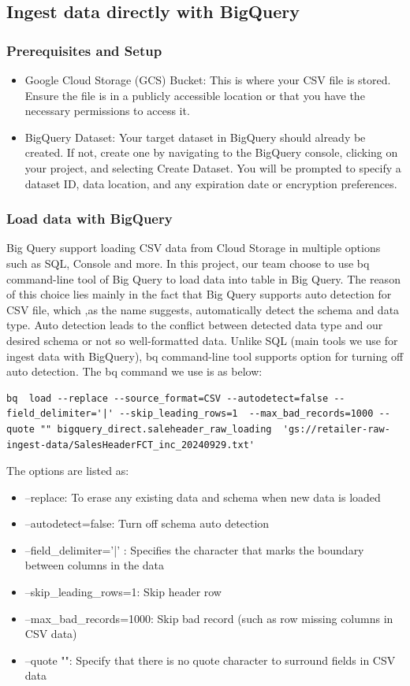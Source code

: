 \subsection{Ingest data directly with BigQuery}
\subsubsection{Prerequisites and Setup}
\begin{itemize}
    \item Google Cloud Storage (GCS) Bucket: This is where your CSV file is stored. Ensure the file is in a publicly accessible location or that you have the necessary permissions to access it.
\item BigQuery Dataset: Your target dataset in BigQuery should already be created. If not, create one by navigating to the BigQuery console, clicking on your project, and selecting Create Dataset. You will be prompted to specify a dataset ID, data location, and any expiration date or encryption preferences.
\end{itemize}
\subsubsection{Load data with BigQuery}
Big Query support loading CSV data from Cloud Storage in multiple options such as SQL, Console and more. In this project, our team choose to use bq command-line tool of Big Query to load data into table in Big Query. The reason of this choice lies mainly in the fact that Big Query supports auto detection for CSV file, which ,as the name suggests, automatically detect the schema and data type. Auto detection leads to the conflict between detected data type and our desired schema or not so well-formatted data. Unlike SQL (main tools we use for ingest data with BigQuery), bq command-line tool supports option for turning off auto detection. The bq command we use is as below:
\begin{lstlisting}
bq  load --replace --source_format=CSV --autodetect=false --field_delimiter='|' --skip_leading_rows=1  --max_bad_records=1000 --quote "" bigquery_direct.saleheader_raw_loading  'gs://retailer-raw-ingest-data/SalesHeaderFCT_inc_20240929.txt' 
\end{lstlisting}
The options are listed as:
\begin{itemize}
    \item --replace: To erase any existing data and schema when new data is loaded
    \item --autodetect=false: Turn off schema auto detection
    \item --field\_delimiter='|' : Specifies the character that marks the boundary between columns in the data
    \item  --skip\_leading\_rows=1: Skip header row
    \item --max\_bad\_records=1000: Skip bad record (such as row missing columns in CSV data)
    \item --quote "": Specify that there is no quote character to surround fields in CSV data
\end{itemize}
